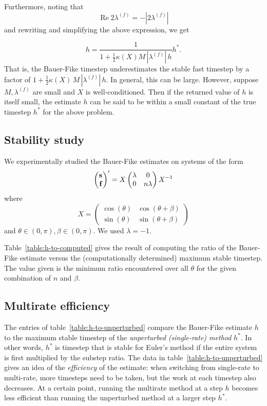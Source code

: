 \documentclass[10pt]{article}
\renewcommand{\Re}{\mathop{\textrm{Re}}}
\begin{document}
Furthermore, noting that
%
\[ \Re 2 \lambda^{(f)} = - | 2 \lambda^{(f)} | \]
%
and rewriting and simplifying the above expression, we get

%
\[ h = \frac{1}{1 + \frac{1}{2} \kappa(X) M \, |\lambda^{(f)}| \, h} h^*. \]
%
That is, the Bauer-Fike timestep underestimates the stable fast timestep
by a factor of $1 + \frac{1}{2} \kappa(X) \, M \, |\lambda^{(f)}| \, h$.
 In general, this can
be large. However, suppose $M, \lambda^{(f)}$ are small and $X$ is
well-conditioned. Then if the returned value of $h$ is itself small, the
estimate $h$ can be said to be within a small constant of the true
timestep $h^*$ for the above problem.

\subsection*{Stability study}

We experimentally studied the Bauer-Fike estimates on systems of the
form
%
\[ \begin{pmatrix} \mathbf{s}_{} \\ \mathbf{f}_{} \end{pmatrix}' = X \begin{pmatrix} \lambda & 0 \\
  0 & n \lambda \end{pmatrix} X^{-1} \]
%
where
%
\[ X = \begin{pmatrix} \cos(\theta) & \cos(\theta + \beta) \\
       \sin(\theta) & \sin(\theta + \beta) \end{pmatrix} \]
%
and $\theta \in (0, \pi), \beta \in (0, \pi)$. We used $\lambda = -1$.

Table~\ref{table:h-to-computed} gives the result of computing the ratio
of the Bauer-Fike estimate versus the (computationally determined)
maximum stable timestep. The value given is the minimum ratio
encountered over all $\theta$ for the given combination of $n$ and
$\beta$.

\subsection*{Multirate efficiency}

The entries of table~\ref{table:h-to-unperturbed} compare the Bauer-Fike
estimate $h$ to the maximum stable timestep of the \emph{unperturbed
  (single-rate) method} $h^*$. In other words, $h^*$ is timestep that is
stable for Euler's method if the entire system is first multiplied by
the substep ratio. The data in table~\ref{table:h-to-unperturbed} gives
an idea of the \emph{efficiency} of the estimate: when switching from
single-rate to multi-rate, more timesteps need to be taken, but the work
at each timestep also decreases. At a certain point, running the
multirate method at a step $h$ becomes less efficient than running the
unperturbed method at a larger step $h^*$.
\end{document}
